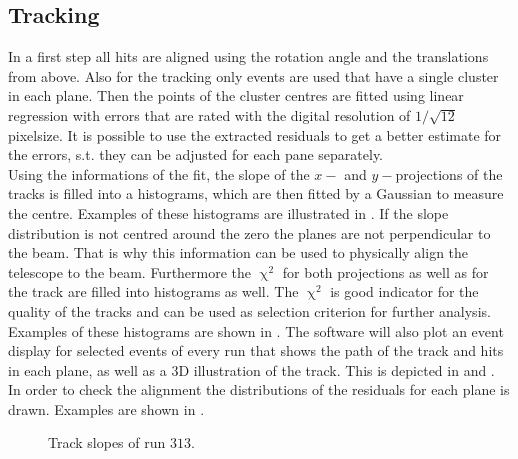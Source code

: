 \documentclass[british,11pt,a4paper]{memoir}
\begin{document}
\subsection{Tracking}
In a first step all hits are aligned using the rotation angle and the translations from above. Also for the tracking only events are used that have a single cluster in each plane. Then the points of the cluster centres are fitted using linear regression with errors that are rated with the digital resolution of $1/\sqrt{12}\,$pixelsize. It is possible to use the extracted residuals to get a better estimate for the errors, s.t. they can be adjusted for each pane separately.\\
Using the informations of the fit, the slope of the $x-$ and $y-$projections of the tracks is filled into a histograms, which are then fitted by a Gaussian to measure the centre. Examples of these histograms are illustrated in . If the slope distribution is not centred around the zero the planes are not perpendicular to the beam. That is why this information can be used to physically align the telescope to the beam. Furthermore the $\upchi^{2}$ for both projections as well as for the track are filled into histograms as well. The $\upchi^{2}$ is good indicator for the quality of the tracks and can be used as selection criterion for further analysis. Examples of these histograms are shown in .
The software will also plot an event display for selected events of every run that shows the path of the track and hits in each plane, as well as a 3D illustration of the track. This is depicted in  and .\\
In order to check the alignment the distributions of the residuals for each plane is drawn. Examples are shown in .
\begin{figure}[ht]
	\centering
	\hfill
	\caption{Track slopes of run $313$.}
	\label{pslope}
\end{figure}\no
\end{document}
